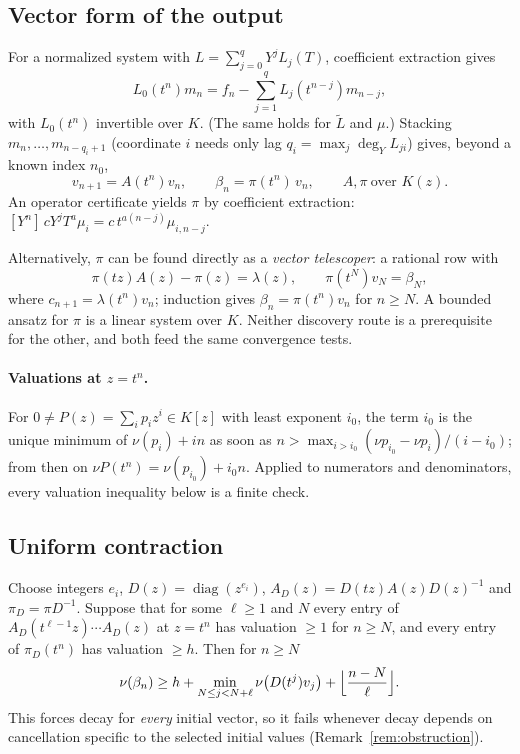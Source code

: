 \documentclass[11pt,a4paper]{article}
\newcommand{\val}{\nu}
\newcommand{\Lt}{\widetilde L}
\theoremstyle{plain}
\theoremstyle{definition}
\theoremstyle{remark}
\begin{document}
\subsection{Vector form of the output}
For a normalized system with $L=\sum_{j=0}^qY^jL_j(T)$, coefficient
extraction gives
\[
  L_0(t^n)m_n=f_n-\sum_{j=1}^{q}L_j(t^{n-j})m_{n-j},
\]
with $L_0(t^n)$ invertible over $K$. (The same holds for $\Lt$ and $\mu$.)
Stacking $m_n,\dots,m_{n-q_i+1}$ (coordinate $i$ needs only lag
$q_i=\max_j\deg_YL_{ji}$) gives, beyond a known index $n_0$,
\begin{equation}\label{eq:state}
  v_{n+1}=A(t^n)v_n,\qquad \beta_n=\pi(t^n)\,v_n,\qquad A,\pi\ \text{over }K(z).
\end{equation}
An operator certificate yields $\pi$ by coefficient extraction:
$[Y^n]\,cY^jT^a\mu_i=c\,t^{a(n-j)}\mu_{i,n-j}$.

Alternatively, $\pi$ can be found directly as a \emph{vector telescoper}:
a rational row with
\begin{equation}\label{eq:telescoper}
  \pi(tz)A(z)-\pi(z)=\lambda(z),\qquad \pi(t^{N})v_{N}=\beta_{N},
\end{equation}
where $c_{n+1}=\lambda(t^n)v_n$; induction gives $\beta_n=\pi(t^n)v_n$ for
$n\ge N$. A bounded ansatz for $\pi$ is a linear system over $K$. Neither
discovery route is a prerequisite for the other, and both feed the same
convergence tests.

\paragraph{Valuations at $z=t^n$.} For $0\ne P(z)=\sum_ip_iz^i\in K[z]$ with
least exponent $i_0$, the term $i_0$ is the unique minimum of
$\val(p_i)+in$ as soon as $n>\max_{i>i_0}(\val p_{i_0}-\val p_i)/(i-i_0)$;
from then on $\val P(t^n)=\val(p_{i_0})+i_0n$. Applied to numerators and
denominators, every valuation inequality below is a finite check.

\subsection{Uniform contraction}
Choose integers $e_i$, $D(z)=\operatorname{diag}(z^{e_i})$,
$A_D(z)=D(tz)A(z)D(z)^{-1}$ and $\pi_D=\pi D^{-1}$. Suppose that for some
$\ell\ge1$ and $N$ every entry of $A_D(t^{\ell-1}z)\cdots A_D(z)$ at $z=t^n$
has valuation $\ge1$ for $n\ge N$, and every entry of $\pi_D(t^n)$ has valuation
$\ge h$. Then for $n\ge N$
\begin{equation}\label{eq:contraction}
  \val(\beta_n)\ge h+\min_{N\le j<N+\ell}\val\bigl(D(t^j)v_j\bigr)
  +\Bigl\lfloor\frac{n-N}{\ell}\Bigr\rfloor.
\end{equation}
This forces decay for \emph{every} initial vector, so it fails whenever decay
depends on cancellation specific to the selected initial values
(Remark~\ref{rem:obstruction}).
\end{document}
